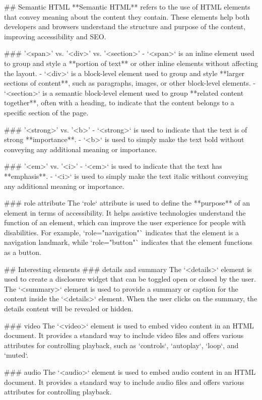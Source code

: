 ## Semantic HTML
**Semantic HTML** refers to the use of HTML elements that convey meaning about the content they contain. These elements help both developers and browsers understand the structure and purpose of the content, improving accessibility and SEO.

### '<span>' vs. '<div>' vs. '<section>'
- `<span>` is an inline element used to group and style a **portion of text** or other inline elements without affecting the layout.
- `<div>` is a block-level element used to group and style **larger sections of content**, such as paragraphs, images, or other block-level elements.
- `<section>` is a semantic block-level element used to group **related content together**, often with a heading, to indicate that the content belongs to a specific section of the page.

### '<strong>' vs. '<b>'
- `<strong>` is used to indicate that the text is of strong **importance**.
- `<b>` is used to simply make the text bold without conveying any additional meaning or importance.

### '<em>' vs. '<i>'
- `<em>` is used to indicate that the text has **emphasis**.
- `<i>` is used to simply make the text italic without conveying any additional meaning or importance.

### role attribute
The `role` attribute is used to define the **purpose** of an element in terms of accessibility. It helps assistive technologies understand the function of an element, which can improve the user experience for people with disabilities. For example, `role="navigation"` indicates that the element is a navigation landmark, while `role="button"` indicates that the element functions as a button.

## Interesting elements
### details and summary
The `<details>` element is used to create a disclosure widget that can be toggled open or closed by the user. 
The `<summary>` element is used to provide a summary or caption for the content inside the `<details>` element. When the user clicks on the summary, the details content will be revealed or hidden.

### video
The `<video>` element is used to embed video content in an HTML document. 
It provides a standard way to include video files and offers various attributes for controlling playback, such as `controls`, `autoplay`, `loop`, and `muted`. 

### audio
The `<audio>` element is used to embed audio content in an HTML document.
It provides a standard way to include audio files and offers various attributes for controlling playback.

